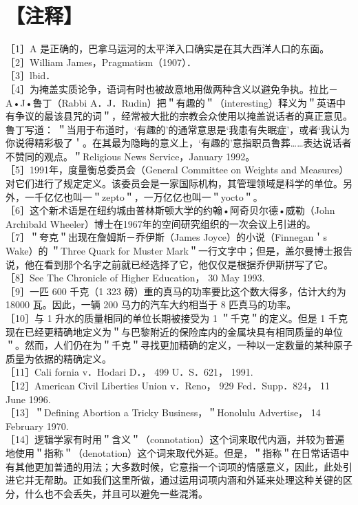 \section*{【注释】}
［1］A 是正确的，巴拿马运河的太平洋入口确实是在其大西洋人口的东面。\\
［2］William James，Pragmatism（1907）．\\
［3］lbid．\\
［4］为掩盖实质论争，语词有时也被故意地用做两种含义以避免争执。拉比－ A•J•鲁丁（Rabbi A．J．Rudin）把＂有趣的＂（interesting）释义为＂英语中有争议的最该县咒的词＂，经常被大批的宗教会众使用以掩盖说话者的真正意见。鲁丁写道： ＂当用于布道时，‘有趣的’的通常意思是‘我患有失眠症’，或者‘我认为你说得精彩极了＇。在其最为隐䀲的意义上，‘有趣的’意指职员鲁葬……表达说话者不赞同的观点。＂Religious News Service，January 1992。\\
［5］1991年，度量衡总委员会（General Committee on Weights and Measures）对它们进行了规定定义。该委员会是一家国际机构，其管理领域是科学的单位。另外，一千亿亿也叫一＂zepto＂，一万亿亿也叫一＂yocto＂。\\
［6］这个新术语是在纽约城由普林斯顿大学的约翰•阿奇贝尔德•威勒（John Archibald Wheeler）博士在1967年的空间研究组织的一次会议上引进的。\\
［7］＂夸克＂出现在詹姆斯－乔伊斯（James Joyce）的小说（Finnegan＇s Wake）的 ＂Three Quark for Muster Mark＂一行文字中；但是，盖尔曼博士报告说，他在看到那个名字之前就已经选择了它，他仅仅是根据乔伊斯拼写了它。\\
［8］See The Chronicle of Higher Education， 30 May 1993.\\
［9］一匹 600 千克（1 323 磅）重的真马的功率要比这个数大得多，估计大约为 18000 瓦。因此，一辆 200 马力的汽车大约相当于 8 匹真马的功率。\\
［10］与 1 升水的质量相同的单位长期被接受为 1 ＂千克＂的定义。但是 1 千克现在已经更精确地定义为＂与巴黎附近的保险库内的金属块具有相同质量的单位＂。然而，人们仍在为＂千克＂寻找更加精确的定义，一种以一定数量的某种原子质量为依据的精确定义。\\
［11］Cali fornia v．Hodari D．， 499 U．S．621， 1991.\\
［12］American Civil Liberties Union v．Reno， 929 Fed．Supp．824， 11 June 1996.\\
［13］＂Defining Abortion a Tricky Business，＂Honolulu Advertise， 14 February 1970.\\
［14］逻辑学家有时用＂含义＂（connotation）这个词来取代内涵，并较为普遍地使用＂指称＂（denotation）这个词来取代外延。但是，＂指称＂在日常话语中有其他更加普通的用法；大多数时候，它意指一个词项的情感意义，因此，此处引进它并无帮助。正如我们这里所做，通过运用词项内涵和外延来处理这种关键的区分，什么也不会丢失，并且可以避免一些混淆。\\
